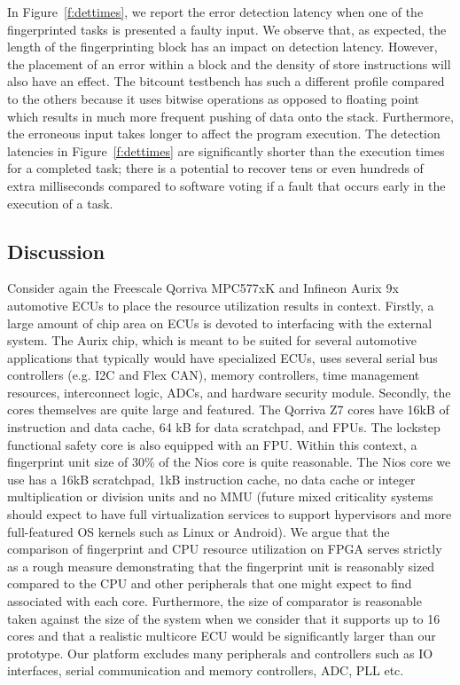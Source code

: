 	In Figure~\ref{f:dettimes}, we report the error detection latency when one of the fingerprinted tasks is presented a faulty input.
	We observe that, as expected, the length of the fingerprinting block has an impact on detection latency.
	However, the placement of an error within a block and the density of store instructions will also have an effect.
	The bitcount testbench has such a different profile compared to the others because it uses bitwise operations as opposed to floating point which results in much more frequent pushing of data onto the stack. Furthermore, the erroneous input takes longer to affect the program execution.
		The detection latencies in Figure~\ref{f:dettimes} are significantly shorter than the execution times for a completed task; there is a potential to recover tens or even hundreds of extra milliseconds compared to software voting if a fault that occurs early in the execution of a task.
	
\subsection{Discussion}
	
	Consider again the Freescale Qorriva MPC577xK \cite{freescale2014qorivva} and Infineon Aurix 9x automotive ECUs \cite{infineon2014aurix} to place the resource utilization results in context. Firstly, a large amount of chip area on ECUs is devoted to interfacing with the external system. The Aurix chip, which is meant to be suited for several automotive applications that typically would have specialized ECUs, uses several serial bus controllers (e.g. I2C and Flex CAN), memory controllers, time management resources, interconnect logic, ADCs, and hardware security module. Secondly, the cores themselves are quite large and featured. The Qorriva Z7 cores have 16kB of instruction and data cache, 64 kB for data scratchpad, and FPUs. The lockstep functional safety core is also equipped with an FPU. Within this context, a fingerprint unit size of 30\% of the Nios core is quite reasonable. The Nios core we use has a 16kB scratchpad, 1kB instruction cache, no data cache or integer multiplication or division units and no MMU (future mixed criticality systems should expect to have full virtualization services to support hypervisors and more full-featured OS kernels such as Linux or Android). We argue that the comparison of fingerprint and CPU resource utilization on FPGA serves strictly as a rough measure demonstrating that the fingerprint unit is reasonably sized compared to the CPU and other peripherals that one might expect to find associated with each core. Furthermore, the size of comparator is reasonable taken against the size of the system when we consider that it supports up to 16 cores and that a realistic multicore ECU would be significantly larger than our prototype. Our platform excludes many peripherals and controllers such as IO interfaces, serial communication and memory controllers, ADC, PLL etc. 
	
